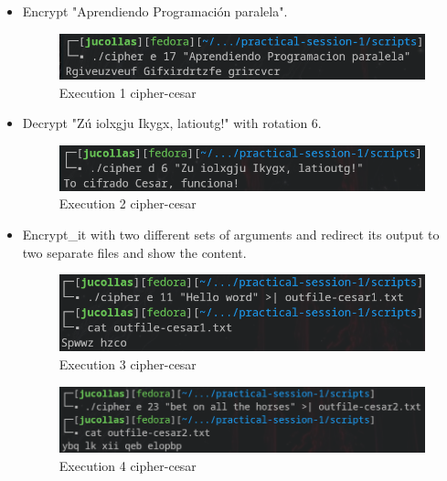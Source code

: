\documentclass[12pt]{article}
\begin{document}
\begin{itemize}
    \item  Encrypt "Aprendiendo Programación paralela".
    \begin{figure}[H]
        \centering
        \includegraphics[width=0.8\linewidth]{images/cipher-execute1.png}
        \caption{Execution 1 cipher-cesar}
        \label{fig:os}
    \end{figure}
    
    \item  Decrypt "Zú iolxgju Ikygx, latioutg!" with rotation 6.

    \begin{figure}[H]
        \centering
        \includegraphics[width=0.8\linewidth]{images/cipher-execute2.png}
        \caption{Execution 2 cipher-cesar}
    \end{figure}

    \item  Encrypt\_it with two different sets of arguments and redirect its output to two separate files and show the content.

    \begin{figure}[H]
        \centering
        \includegraphics[width=0.8\linewidth]{images/cipher-execute3.png}
        \caption{Execution 3 cipher-cesar}
    \end{figure}

    \begin{figure}[H]
        \centering
        \includegraphics[width=0.8\linewidth]{images/cipher-execute4.png}
        \caption{Execution 4 cipher-cesar}
    \end{figure}
    

\end{itemize}
\end{document}
